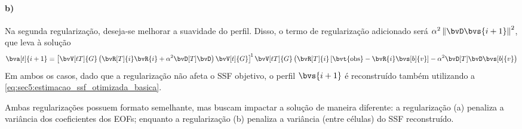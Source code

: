 \paragraph{b)} Na segunda regularização, deseja-se melhorar a suavidade do perfil. Disso, o termo de regularização adicionado será $\alpha^2 \norm{\bvD \bvs{i+1}}^2$, que leva à solução
\begin{equation}
	\bva[t]{i+1} = \inv*{ \bvV[tT]{G} \pts{\bvR[T]{i} \bvR{i} + \alpha^2 \bvD[T] \bvD} \bvV[t]{G} } \bvV[tT]{G} \pts{ \bvR[T]{i} \bts{\bvt{\obs} - \bvR{i} \bvs[b]{v}} - \alpha^2 \bvD[T] \bvD \bvs[b]{v} }
	\label{eq:sec5:metodo_eof:reg_suavidade}
\end{equation}
Em ambos os casos, dado que a regularização não afeta o SSF objetivo, o perfil $\bvs{i+1}$ é reconstruído também utilizando a \cref{eq:sec5:estimacao_ssf_otimizada_basica}.

Ambas regularizações possuem formato semelhante, mas buscam impactar a solução de maneira diferente: a regularização (a) penaliza a variância dos coeficientes dos EOFs; enquanto a regularização (b) penaliza a variância (entre células) do SSF reconstruído.